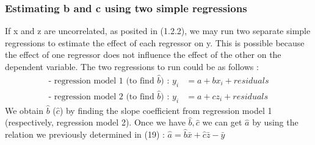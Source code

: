 \documentclass{article}
\begin{document}
\subsubsection{Estimating b and c using two simple regressions}
If x and z are uncorrelated, as posited in (1.2.2), we may run two separate simple regressions to estimate the effect of each regressor on y. This is possible because the effect of one regressor does not influence the effect of the other on the dependent variable. 
The two regressions to run could be as follows : 
\begin{equation}
\begin{aligned}
  \text{- regression model 1 (to find $\hat{b}$) : } y_i & = a + bx_i + residuals\\
  \text{- regression model 2 (to find $\hat{b}$) : } y_i & = a + cz_i + residuals
\end{aligned}
\end{equation}
We obtain $\hat{b}$ ($\hat{c}$) by finding the slope coefficient from regression model 1 (respectively, regression model 2).
Once we have $\hat{b}, \hat{c}$ we can get $\hat{a}$ by using the relation we previously determined in (19) : $\hat{a} =  \hat{b}\bar{x} + \hat{c}\bar{z} - \bar{y}$
\end{document}
